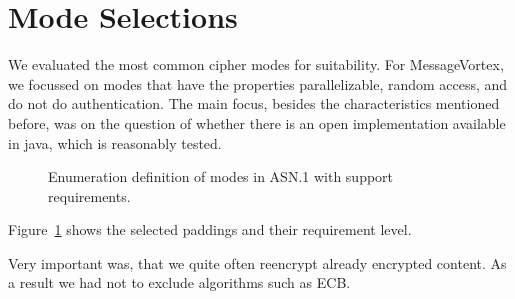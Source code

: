 \section{Mode Selections}
We evaluated the most common cipher modes for suitability. For MessageVortex, we focussed on modes that have the properties parallelizable, random access, and do not do authentication. The main focus, besides the characteristics mentioned before, was on the question of whether there is an open implementation available in java, which is reasonably tested.

\begin{figure}[ht]
	
	\caption{Enumeration definition of modes in ASN.1 with support requirements.}
	\label{fig:defModes}
\end{figure}

Figure~\ref{fig:defModes} shows the selected paddings and their requirement level.

Very important was, that we quite often reencrypt already encrypted content. As a result we had not to exclude algorithms such as ECB.

